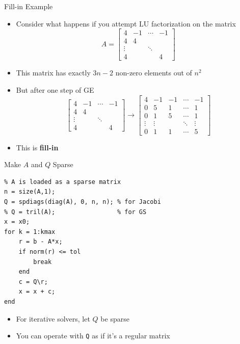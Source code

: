 \documentclass[10pt]{beamer}
\begin{document}
\begin{frame}{Fill-in Example}
\begin{itemize}
    \item Consider what happens if you attempt LU factorization on the matrix 
    $$
    A = \begin{bmatrix} 
    4 & -1 & \cdots & -1 \\
    4 & 4 &  &\\
    \vdots & & \ddots &  \\
    4 & &  & 4
    \end{bmatrix}
    $$
     \item This matrix has exactly $3n-2$ non-zero elements out of $n^2$

     \item But after one step of GE 
     $$
    \begin{bmatrix} 
    4 & -1 & \cdots & -1 \\
    4 & 4 &  &\\
    \vdots & & \ddots &  \\
    4 & &  & 4
    \end{bmatrix} \longrightarrow
    \begin{bmatrix} 
    4 & -1& -1& \cdots & -1 \\
    0 & 5 & 1 &\cdots&1\\
    0 & 1 & 5 &\cdots&1\\
    \vdots &\vdots & & \ddots &\vdots  \\
    0 &1 & 1  & \cdots& 5
    \end{bmatrix}
     $$
     \item This is \textbf{fill-in}
\end{itemize}
\end{frame}



\begin{frame}[fragile]{Make $A$ and $Q$ Sparse}

\begin{lstlisting}
% A is loaded as a sparse matrix
n = size(A,1);
Q = spdiags(diag(A), 0, n, n); % for Jacobi
% Q = tril(A);                 % for GS
x = x0;
for k = 1:kmax
    r = b - A*x;
    if norm(r) <= tol
        break
    end
    c = Q\r;
    x = x + c;
end
\end{lstlisting}

\begin{itemize}
    \item For iterative solvers, let $Q$ be sparse
    \item You can operate with \texttt{Q} as if it's a regular matrix
\end{itemize}


\end{frame}
\end{document}
